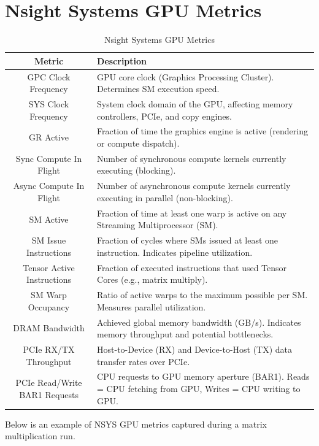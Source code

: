 \section{Nsight Systems GPU Metrics}
\begin{table}[h]
\centering
\begin{tabular}{|c|p{11cm}|}
\hline
\textbf{Metric} & \textbf{Description} \\ \hline
GPC Clock Frequency & GPU core clock (Graphics Processing Cluster). Determines SM execution speed. \\ \hline
SYS Clock Frequency & System clock domain of the GPU, affecting memory controllers, PCIe, and copy engines. \\ \hline
GR Active & Fraction of time the graphics engine is active (rendering or compute dispatch). \\ \hline
Sync Compute In Flight & Number of synchronous compute kernels currently executing (blocking). \\ \hline
Async Compute In Flight & Number of asynchronous compute kernels currently executing in parallel (non-blocking). \\ \hline
SM Active & Fraction of time at least one warp is active on any Streaming Multiprocessor (SM). \\ \hline
SM Issue Instructions & Fraction of cycles where SMs issued at least one instruction. Indicates pipeline utilization. \\ \hline
Tensor Active Instructions & Fraction of executed instructions that used Tensor Cores (e.g., matrix multiply). \\ \hline
SM Warp Occupancy & Ratio of active warps to the maximum possible per SM. Measures parallel utilization. \\ \hline
DRAM Bandwidth & Achieved global memory bandwidth (GB/s). Indicates memory throughput and potential bottlenecks. \\ \hline
PCIe RX/TX Throughput & Host-to-Device (RX) and Device-to-Host (TX) data transfer rates over PCIe. \\ \hline
PCIe Read/Write BAR1 Requests & CPU requests to GPU memory aperture (BAR1). Reads = CPU fetching from GPU, Writes = CPU writing to GPU. \\ \hline
\end{tabular}
\caption{Nsight Systems GPU Metrics}
\label{tab:nsys_metrics}
\end{table}


Below is an example of NSYS GPU metrics captured during a matrix multiplication run.

